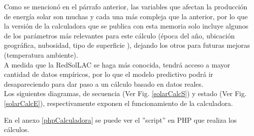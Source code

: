 Como se mencionó en el párrafo anterior, las variables que afectan la producción de energía solar son muchas y cada una más compleja que la anterior, por lo que la versión de la calculadora que se publica con esta memoria solo incluye algunos de los parámetros más relevantes para este cálculo (época del año, ubicación geográfica, nubosidad, tipo de superficie ), dejando los otros para futuras mejoras (temperatura ambiente).\\

A medida que la RedSolLAC se haga más conocida, tendrá acceso a mayor cantidad de datos empíricos, por lo que el modelo predictivo podrá ir desapareciendo para dar paso a un cálculo basado en datos reales.\\

Los siguientes diagramas, de secuencia (Ver Fig. \ref{solarCalcS}) y estado (Ver Fig. \ref{solarCalcE}), respectivamente exponen el funcionamiento de la calculadora.

En el anexo \ref{phpCalculadora} se puede ver el ''script'' en PHP que realiza los cálculos.\\

